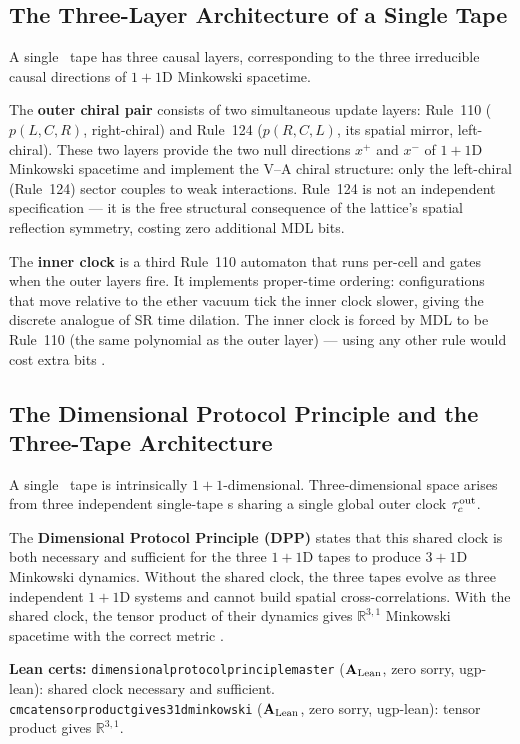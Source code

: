 \documentclass[11pt,openany]{book}
\theoremstyle{remark}
\newcommand{\lean}[1]{%
  \penalty-100
  \begingroup\def\_{\textunderscore\allowbreak}\texttt{#1}\endgroup}
\newcommand{\CMCA}{\text{CMCA}}
\newcommand{\CatAL}{\ensuremath{\textbf{A}_{\rm Lean}}}
\begin{document}
\subsection*{The Three-Layer Architecture of a Single Tape}

A single \CMCA\ tape has three causal layers, corresponding to the three irreducible
causal directions of $1{+}1$D Minkowski spacetime.

The \textbf{outer chiral pair} consists of two simultaneous update layers:
Rule~110 ($p(L,C,R)$, right-chiral) and Rule~124 ($p(R,C,L)$, its spatial mirror, left-chiral).
These two layers provide the two null directions $x^+$ and $x^-$ of $1{+}1$D Minkowski
spacetime and implement the V--A chiral structure: only the left-chiral (Rule~124) sector
couples to weak interactions.
Rule~124 is not an independent specification --- it is the free structural consequence of
the lattice's spatial reflection symmetry, costing zero additional MDL bits.

The \textbf{inner clock} is a third Rule~110 automaton that runs per-cell and gates when
the outer layers fire.
It implements proper-time ordering: configurations that move relative to the ether vacuum
tick the inner clock slower, giving the discrete analogue of SR time dilation.
The inner clock is forced by MDL to be Rule~110 (the same polynomial as the outer layer)
--- using any other rule would cost extra bits \cite{SpivackCMCA,SpivackThreeTapeCMCA}.

\subsection*{The Dimensional Protocol Principle and the Three-Tape Architecture}

A single \CMCA\ tape is intrinsically $1{+}1$-dimensional.
Three-dimensional space arises from three independent single-tape \CMCA{}s sharing a single
global outer clock $\tau_c^{\rm out}$.

The \textbf{Dimensional Protocol Principle (DPP)} states that this shared clock is both
necessary and sufficient for the three $1{+}1$D tapes to produce $3{+}1$D Minkowski dynamics.
Without the shared clock, the three tapes evolve as three independent $1{+}1$D systems and
cannot build spatial cross-correlations.
With the shared clock, the tensor product of their dynamics gives $\mathbb{R}^{3,1}$
Minkowski spacetime with the correct metric \cite{SpivackThreeTapeCMCA}.

\textbf{Lean certs:}
\lean{dimensional\_protocol\_principle\_master} (\CatAL, zero sorry, ugp-lean):
shared clock necessary and sufficient.
\lean{cmca\_tensor\_product\_gives\_31d\_minkowski} (\CatAL, zero sorry, ugp-lean):
tensor product gives $\mathbb{R}^{3,1}$.
\end{document}

